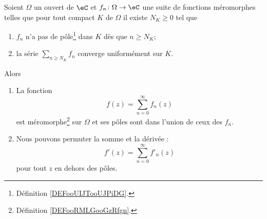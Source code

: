 \begin{proposition} \label{PropPUZTQKl}
	Soient \( \Omega\) un ouvert de \( \eC\) et \( f_n\colon \Omega\to \eC\) une suite de fonctions méromorphes telles que pour tout compact \( K\) de \( \Omega\) il existe \( N_K\geq 0\) tel que
	\begin{enumerate}
		\item
		      \( f_n\) n'a pas de pôle\footnote{Définition \ref{DEFooUIJTooUJPiDG}.} dans \( K\) dès que \( n\geq N_K\);
		\item
		      la série \( \sum_{n\geq N_K}f_n\) converge uniformément sur \( K\).
	\end{enumerate}
	Alors
	\begin{enumerate}
		\item		\label{ITEMooZKACooLKHmaj}
		      La fonction
		      \begin{equation}
			      f(z)=\sum_{n=0}^{\infty}f_n(z)
		      \end{equation}
		      est méromorphe\footnote{Définition \ref{DEFooRMLGooGzRfgn}.} sur \( \Omega\) et ses pôles sont dans l'union de ceux des \( f_n\).
		\item		\label{ITEMooRRCWooHXgpoc}
		      Nous pouvons permuter la somme et la dérivée :
		      \begin{equation}
			      f'(z)=\sum_{n=0}^{\infty}f'_n(z)
		      \end{equation}
		      pour tout \( z\) en dehors des pôles.
	\end{enumerate}
\end{proposition}

